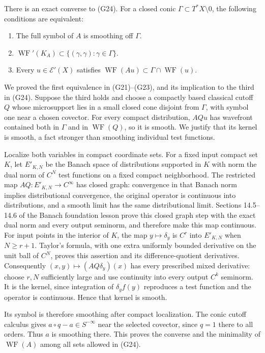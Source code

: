 \documentclass[
  11pt,
]{article}
\providecommand{\tightlist}{%
  \setlength{\itemsep}{0pt}\setlength{\parskip}{0pt}}
\begin{document}
There is an exact converse to (G24). For a closed conic
\(\Gamma\subset T^*X\setminus0\), the following conditions are
equivalent:

\begin{enumerate}
\def\labelenumi{\arabic{enumi}.}
\tightlist
\item
  The full symbol of \(A\) is smoothing off \(\Gamma\).
\item
  \(\operatorname{WF}'(K_A)\subset\{(\gamma,\gamma):\gamma\in\Gamma\}\).
\item
  Every \(u\in\mathcal E'(X)\) satisfies
  \(\operatorname{WF}(Au)\subset\Gamma\cap\operatorname{WF}(u)\).
\end{enumerate}

We proved the first equivalence in (G21)--(G23), and its implication to
the third in (G24). Suppose the third holds and choose a compactly based
classical cutoff \(Q\) whose microsupport lies in a small closed cone
disjoint from \(\Gamma\), with symbol one near a chosen covector. For
every compact distribution, \(AQ u\) has wavefront contained both in
\(\Gamma\) and in \(\operatorname{WF}(Q)\), so it is smooth. We justify
that its kernel is smooth, a fact stronger than smoothing individual
test functions.

Localize both variables in compact coordinate sets. For a fixed input
compact set \(K\), let \(E'_{K,N}\) be the Banach space of distributions
supported in \(K\) with norm the dual norm of \(C^N\) test functions on
a fixed compact neighborhood. The restricted map
\(AQ:E'_{K,N}\to C^\infty\) has closed graph: convergence in that Banach
norm implies distributional convergence, the original operator is
continuous into distributions, and a smooth limit has the same
distributional limit. Sections 14.5--14.6 of the Banach foundation
lesson prove this closed graph step with the exact dual norm and every
output seminorm, and therefore make this map continuous. For input
points in the interior of \(K\), the map \(y\mapsto\delta_y\) is \(C^r\)
into \(E'_{K,N}\) when \(N\geq r+1\). Taylor's formula, with one extra
uniformly bounded derivative on the unit ball of \(C^N\), proves this
assertion and its difference-quotient derivatives. Consequently
\((x,y)\mapsto (AQ\delta_y)(x)\) has every prescribed mixed derivative:
choose \(r,N\) sufficiently large and use continuity into every output
\(C^k\) seminorm. It is the kernel, since integration of
\(\delta_y f(y)\) reproduces a test function and the operator is
continuous. Hence that kernel is smooth.

Its symbol is therefore smoothing after compact localization. The conic
cutoff calculus gives \(a\circ q-a\in S^{-\infty}\) near the selected
covector, since \(q=1\) there to all orders. Thus \(a\) is smoothing
there. This proves the converse and the minimality of
\(\operatorname{WF}(A)\) among all sets allowed in (G24).
\end{document}
